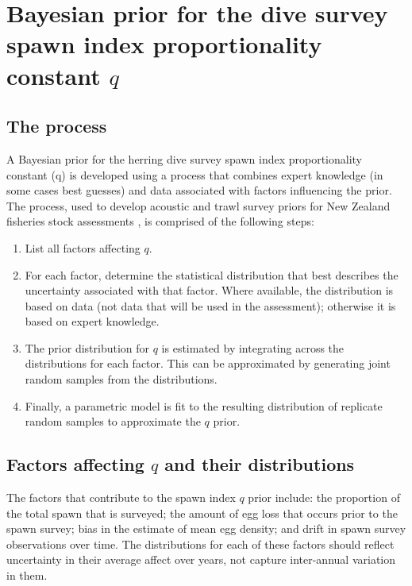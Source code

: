 \section{Bayesian prior for the dive survey spawn index proportionality constant $q$}\label{Appendix::q_prior}

\subsection{The process}

A Bayesian prior for the herring dive survey spawn index proportionality constant (q) is developed using a process that combines expert knowledge (in some cases best guesses) and data associated with factors influencing the prior.  The process, used to develop acoustic and trawl survey priors for New Zealand fisheries stock assessments \citep[e.g.,][]{CordueInPrep}, is comprised of the following steps: 

\begin{enumerate}
\item	List all factors affecting $q$.
\item	For each factor, determine the statistical distribution that best describes the uncertainty associated with that factor.  Where available, the distribution is based on data (not data that will be used in the assessment); otherwise it is based on expert knowledge. 
\item	The prior distribution for $q$ is estimated by integrating across the distributions for each factor.  This can be approximated by generating joint random samples from the distributions.
\item	Finally, a parametric model is fit to the resulting distribution of replicate random samples to approximate the $q$ prior.
\end{enumerate}

\subsection{Factors affecting $q$ and their distributions}
The factors that contribute to the spawn index $q$ prior include: the proportion of the total spawn that is surveyed; the amount of egg loss that occurs prior to the spawn survey; bias in the estimate of mean egg density; and drift in spawn survey observations over time. The distributions for each of these factors should reflect uncertainty in their average affect over years, not capture inter-annual variation in them. 

